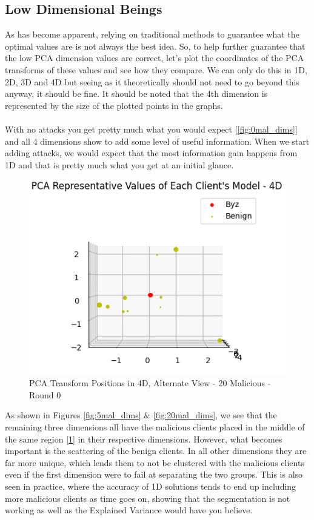 \subsection{Low Dimensional Beings}
As has become apparent, relying on traditional methods to guarantee what the optimal values are is not always the best idea.
So, to help further guarantee that the low PCA dimension values are correct, let's plot the coordinates of the PCA transforms of these values and see how they compare.
We can only do this in 1D, 2D, 3D and 4D but seeing as it theoretically should not need to go beyond this anyway, it should be fine.
It should be noted that the 4th dimension is represented by the size of the plotted points in the graphs.
\\ \\
With no attacks you get pretty much what you would expect [\ref{fig:0mal_dims}] and all 4 dimensions show to add some level of useful information.
When we start adding attacks, we would expect that the most information gain happens from 1D and that is pretty much what you get at an initial glance.

\begin{figure}[htbp]
	\centering
    \includegraphics[scale=0.7]{my_agg/graphs/4d_diff.png}
	\caption{PCA Transform Positions in 4D, Alternate View - 20 Malicious - Round 0}
	\label{fig:4d_diff}
\end{figure}

As shown in Figures \ref{fig:5mal_dims} \& \ref{fig:20mal_dims}, we see that the remaining three dimensions all have the malicious clients placed in the middle of the same region [\ref{fig:4d_diff}] in their respective dimensions.
However, what becomes important is the scattering of the benign clients.
In all other dimensions they are far more unique, which lends them to not be clustered with the malicious clients even if the first dimension were to fail at separating the two groups.
This is also seen in practice, where the accuracy of 1D solutions tends to end up including more malicious clients as time goes on, showing that the segmentation is not working as well as the Explained Variance would have you believe.

